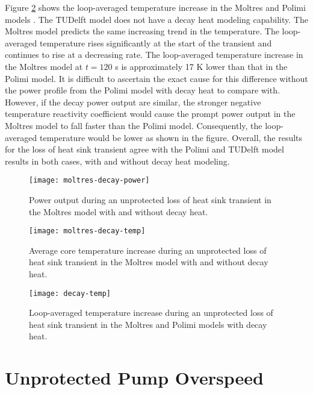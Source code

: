 Figure \ref{fig:polimidecaytemp} shows the loop-averaged temperature
increase in the Moltres and Polimi models \cite{fiorina_modelling_2014}. The
TUDelft model does not have a decay heat modeling capability. The Moltres
model predicts the same increasing trend in the temperature. The loop-averaged
temperature rises significantly at the start of the transient and continues to
rise at a decreasing rate. The loop-averaged temperature increase in the
Moltres model at $t=120$ s is approximately 17 K lower than that in the Polimi
model. It is difficult to ascertain the exact cause for this difference
without the power profile from the Polimi model with decay heat to compare
with. However, if the decay power output are similar, the stronger negative
temperature reactivity coefficient would cause the prompt power output in the
Moltres model to fall faster than the Polimi model. Consequently, the
loop-averaged temperature would be lower as shown in the figure. Overall, the
results for the loss of heat sink transient agree with the Polimi and TUDelft
model results in both cases, with and without decay heat modeling.

\begin{figure}[htbp!]
    \centering
    \texttt{[image: moltres-decay-power]}
    \caption{Power output during
    an unprotected loss of heat sink transient in the Moltres model with and
    without decay heat.}
    \label{fig:moltresdecaypower}
    \texttt{[image: moltres-decay-temp]}
    \caption{Average core temperature increase during
    an unprotected loss of heat sink transient in the Moltres model with and
    without decay heat.}
    \label{fig:moltresdecaytemp}
\end{figure}

\clearpage

\begin{figure}[htbp!]
    \centering
    \texttt{[image: decay-temp]}
    \caption{Loop-averaged temperature increase during
    an unprotected loss of heat sink transient in the Moltres and Polimi
    models \cite{fiorina_modelling_2014} with decay heat.}
    \label{fig:polimidecaytemp}
\end{figure}

\clearpage

\section{Unprotected Pump Overspeed}

